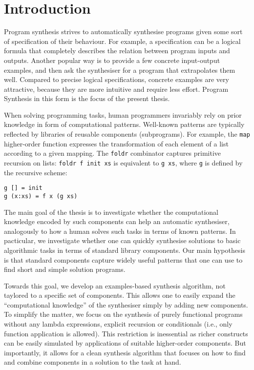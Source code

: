 \lstset{style=plain}

\chapter{Introduction}\label{ch:introduction}
Program synthesis strives to automatically synthesise programs given some sort of specification of their behaviour.   For example, a specification can be a logical formula that completely describes the relation between program inputs and outputs.  Another popular way is to provide a few concrete input-output examples, and then ask the synthesiser for a program that extrapolates them well.  Compared to precise logical specifications, concrete examples are very attractive, because they are more intuitive and require less effort.  Program Synthesis in this form is the focus of the present thesis.

When solving programming tasks, human programmers invariably rely on prior knowledge in form of computational patterns.  Well-known patterns are typically reflected by libraries of reusable components (subprograms).  For example, the \lstinline!map! higher-order function expresses the transformation of each element of a list according to a given mapping.  The \lstinline!foldr! combinator captures primitive recursion on lists: \lstinline!foldr f init xs! is equivalent to \lstinline!g xs!, where \lstinline!g! is defined by the recursive scheme:
\begin{lstlisting}[style=plain]
g [] = init
g (x:xs) = f x (g xs)
\end{lstlisting}

The main goal of the thesis is to investigate whether the computational knowledge encoded by such components can help an automatic synthesiser, analogously to how a human solves such tasks in terms of known patterns.  In pacticular, we investigate whether one can quickly synthesise solutions to basic algorithmic tasks in terms of standard library components.  Our main hypothesis is that standard components capture widely useful patterns that one can use to find short and simple solution programs.

Towards this goal, we develop an examples-based synthesis algorithm, not taylored to a specific set of components.  This allows one to easily expand the ``computational knowledge'' of the synthesiser simply by adding new components.  To simplify the matter, we focus on the synthesis of purely functional programs without any lambda expressions, explicit recursion or conditionals (i.e., only function application is allowed).  This restriction is inessential as richer constructs can be easily simulated by applications of suitable higher-order components.  But importantly, it allows for a clean synthesis algorithm that focuses on how to find and combine components in a solution to the task at hand.

